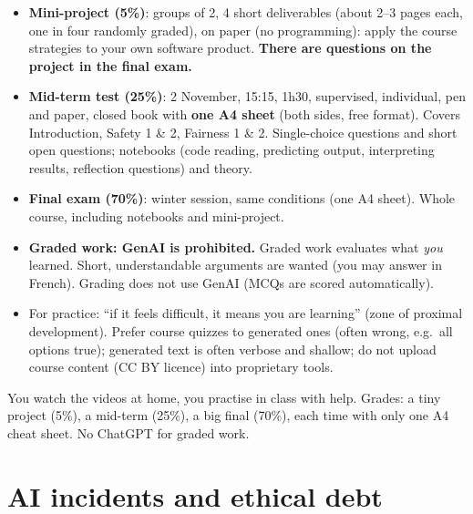 \documentclass[11pt,a4paper,openany]{book}
\begin{document}
\begin{keybox}[title={Evaluation}]
\begin{itemize}
  \item \textbf{Mini-project (5\%)}: groups of 2, 4 short deliverables (about 2--3 pages each,
        one in four randomly graded), on paper (no programming): apply the course strategies to
        your own software product. \textbf{There are questions on the project in the final exam.}
  \item \textbf{Mid-term test (25\%)}: 2 November, 15:15, 1h30, supervised, individual, pen and
        paper, closed book with \textbf{one A4 sheet} (both sides, free format). Covers
        Introduction, Safety 1 \& 2, Fairness 1 \& 2. Single-choice questions and short open
        questions; notebooks (code reading, predicting output, interpreting results, reflection
        questions) and theory.
  \item \textbf{Final exam (70\%)}: winter session, same conditions (one A4 sheet). Whole course,
        including notebooks and mini-project.
\end{itemize}
\end{keybox}

\begin{warnbox}[title={Generative AI in CS-290}]
\begin{itemize}
  \item \textbf{Graded work: GenAI is prohibited.} Graded work evaluates what \emph{you} learned.
        Short, understandable arguments are wanted (you may answer in French). Grading does not
        use GenAI (MCQs are scored automatically).
  \item For practice: ``if it feels difficult, it means you are learning'' (zone of proximal
        development). Prefer course quizzes to generated ones (often wrong, e.g.\ all options
        true); generated text is often verbose and shallow; do not upload course content
        (CC BY licence) into proprietary tools.
\end{itemize}
\end{warnbox}

\begin{goatbox}
You watch the videos at home, you practise in class with help. Grades: a tiny project (5\%), a
mid-term (25\%), a big final (70\%), each time with only one A4 cheat sheet. No ChatGPT for
graded work.
\end{goatbox}


\section{AI incidents and ethical debt}
\end{document}

